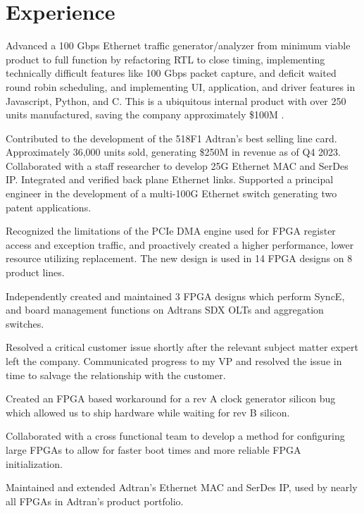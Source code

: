 \documentclass[10pt]{deedy-resume-reversed}
\begin{document}
\begin{minipage}[t]{1.0\textwidth}
\section{Experience}
\vspace{\topsep} %
\begin{tightemize}
\item Advanced a 100 Gbps Ethernet traffic generator/analyzer from minimum viable product to full function by refactoring RTL to close timing, 
implementing technically difficult features like 100 Gbps packet capture, and deficit waited round robin scheduling, and implementing UI, application, 
and driver features in Javascript, Python, and C. This is a ubiquitous internal product with over 250 units manufactured, saving the company approximately \$100M .
\item Contributed to the development of the 518F1 Adtran’s best selling line card. Approximately  36,000 units sold, generating \$250M in revenue as of Q4 2023. 
Collaborated with a staff researcher to develop 25G Ethernet MAC and SerDes IP.
Integrated and verified back plane Ethernet links.
Supported a principal engineer in the development of a multi-100G Ethernet switch generating two patent applications.
\item Recognized the limitations of the PCIe DMA engine used for FPGA register access and exception traffic, 
and proactively created a higher performance, lower resource utilizing replacement. The new design is used in 14 FPGA designs on 8 product lines.
\item Independently created and maintained 3 FPGA designs which perform SyncE, and board management functions on Adtrans SDX OLTs and aggregation switches. 
\item Resolved a critical customer issue shortly after the relevant subject matter expert left the company. 
Communicated progress to my VP and resolved the issue in time to salvage the relationship with the customer.
\item Created an FPGA based workaround for a rev A clock generator silicon bug which allowed us to ship hardware while waiting for rev B silicon.
\item Collaborated with a cross functional team to develop a method for configuring large FPGAs to allow for faster boot times and more reliable FPGA initialization.
\item Maintained and extended Adtran’s Ethernet MAC and SerDes IP, used by nearly all FPGAs in Adtran’s product portfolio.

\end{tightemize}
\end{minipage}
\end{document}
